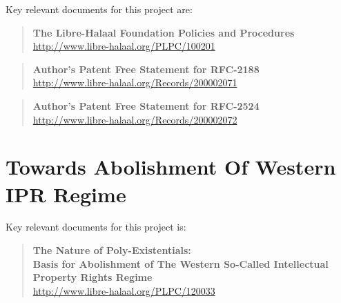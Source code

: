 Key relevant documents for this project are:

\begin{quote}
  \textbf{The Libre-Halaal Foundation Policies and Procedures}\\
  \href{http://www.libre-halaal.org/PLPC/100201}{http://www.libre-halaal.org/PLPC/100201}
\end{quote}
\begin{quote}
  \textbf{Author's Patent Free Statement for RFC-2188}\\
  \href{http://www.libre-halaal.org/Records/200002071}{http://www.libre-halaal.org/Records/200002071}
\end{quote}
\begin{quote}
  \textbf{Author's Patent Free Statement for RFC-2524}\\
  \href{http://www.libre-halaal.org/Records/200002072}{http://www.libre-halaal.org/Records/200002072}
\end{quote}

\section{Towards Abolishment Of Western IPR Regime}

Key relevant documents for this project is:

\begin{quote}
  \textbf{The Nature of Poly-Existentials:}\\
  \textbf{Basis for Abolishment of  The Western So-Called Intellectual Property Rights Regime}\\
  \href{http://www.libre-halaal.org/PLPC/120033}{http://www.libre-halaal.org/PLPC/120033}
\end{quote}

